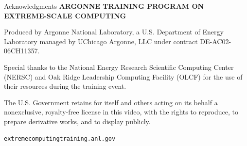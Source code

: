 \begin{frame}{Acknowledgments}
\footnotesize
\textbf{ARGONNE TRAINING PROGRAM ON EXTREME-SCALE COMPUTING}

\medskip
Produced by Argonne National Laboratory, a U.S. Department of Energy Laboratory
managed by UChicago Argonne, LLC under contract DE-AC02-06CH11357.

\medskip
Special thanks to the National Energy Research Scientific Computing Center
(NERSC) and Oak Ridge Leadership Computing Facility (OLCF) for the use of their
resources during the training event.

\medskip
The U.S. Government retains for itself and others acting on its behalf a
nonexclusive, royalty-free license in this video, with the rights to reproduce,
to prepare derivative works, and to display publicly.

\medskip
\texttt{extremecomputingtraining.anl.gov}
\end{frame}
